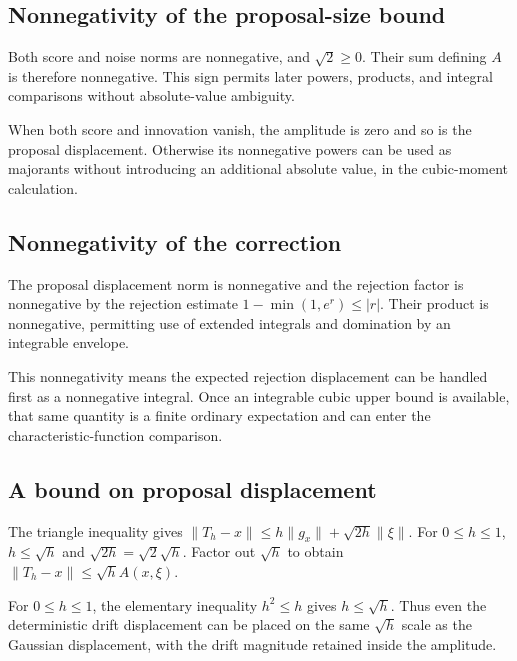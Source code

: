 \documentclass[11pt,a4paper]{article}
\begin{document}
\subsection{\texorpdfstring{Nonnegativity of the proposal-size bound}{Nonnegativity of the proposal-size bound}}


Both score and noise norms are nonnegative, and \(\sqrt2\ge0\). Their sum defining \(A\) is therefore nonnegative. This sign permits later powers, products, and integral comparisons without absolute-value ambiguity.



When both score and innovation vanish, the amplitude is zero and so is the proposal displacement. Otherwise its nonnegative powers can be used as majorants without introducing an additional absolute value, in the cubic-moment calculation.


\subsection{\texorpdfstring{Nonnegativity of the correction}{Nonnegativity of the correction}}


The proposal displacement norm is nonnegative and the rejection factor is nonnegative by the rejection estimate \(1-\min(1,e^r)\le|r|\). Their product is nonnegative, permitting use of extended integrals and domination by an integrable envelope.



This nonnegativity means the expected rejection displacement can be handled first as a nonnegative integral. Once an integrable cubic upper bound is available, that same quantity is a finite ordinary expectation and can enter the characteristic-function comparison.


\subsection{\texorpdfstring{A bound on proposal displacement}{A bound on proposal displacement}}


The triangle inequality gives \(\|T_h-x\|\le h\|g_x\|+\sqrt{2h}\|\xi\|\). For \(0\le h\le1\), \(h\le\sqrt h\) and \(\sqrt{2h}=\sqrt2\sqrt h\). Factor out \(\sqrt h\) to obtain \(\|T_h-x\|\le\sqrt h A(x,\xi)\).



For \(0\le h\le1\), the elementary inequality \(h^2\le h\) gives \(h\le\sqrt h\). Thus even the deterministic drift displacement can be placed on the same \(\sqrt h\) scale as the Gaussian displacement, with the drift magnitude retained inside the amplitude.
\end{document}

